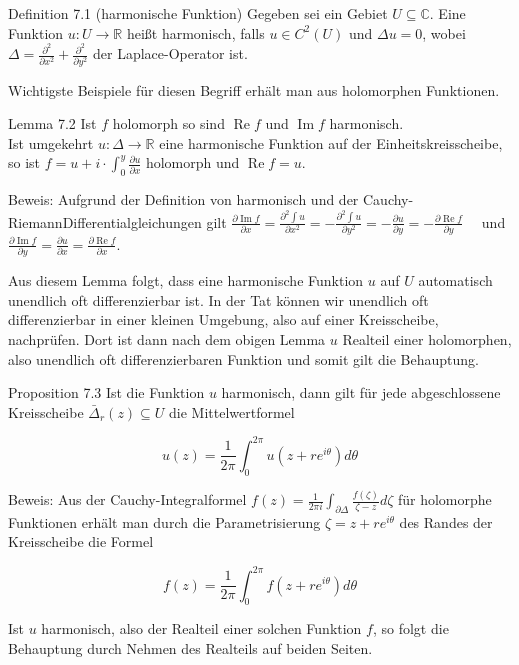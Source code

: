 \documentclass[10pt, letterpaper]{article}
\begin{document}
Definition 7.1 (harmonische Funktion) Gegeben sei ein Gebiet $U \subseteq \mathbb{C}$. Eine Funktion $u: U \rightarrow \mathbb{R}$ heißt harmonisch, falls $u \in C^{2}(U)$ und $\Delta u=0$, wobei $\Delta=\frac{\partial^{2}}{\partial x^{2}}+\frac{\partial^{2}}{\partial y^{2}}$ der Laplace-Operator ist.

Wichtigste Beispiele für diesen Begriff erhält man aus holomorphen Funktionen.

Lemma 7.2 Ist $f$ holomorph so sind $\operatorname{Re} f$ und $\operatorname{Im} f$ harmonisch.\\
Ist umgekehrt $u: \Delta \rightarrow \mathbb{R}$ eine harmonische Funktion auf der Einheitskreisscheibe, so ist $f=u+i \cdot \int_{0}^{y} \frac{\partial u}{\partial x}$ holomorph und $\operatorname{Re} f=u$.

Beweis: Aufgrund der Definition von harmonisch und der Cauchy-RiemannDifferentialgleichungen gilt $\frac{\partial \operatorname{Im} f}{\partial x}=\frac{\partial^{2} \int u}{\partial x^{2}}=-\frac{\partial^{2} \int u}{\partial y^{2}}=-\frac{\partial u}{\partial y}=-\frac{\partial \operatorname{Re} f}{\partial y} \quad$ und $\frac{\partial \operatorname{Im} f}{\partial y}=\frac{\partial u}{\partial x}=\frac{\partial \operatorname{Re} f}{\partial x}$.

Aus diesem Lemma folgt, dass eine harmonische Funktion $u$ auf $U$ automatisch unendlich oft differenzierbar ist. In der Tat können wir unendlich oft differenzierbar in einer kleinen Umgebung, also auf einer Kreisscheibe, nachprüfen. Dort ist dann nach dem obigen Lemma $u$ Realteil einer holomorphen, also unendlich oft differenzierbaren Funktion und somit gilt die Behauptung.

Proposition 7.3 Ist die Funktion $u$ harmonisch, dann gilt für jede abgeschlossene Kreisscheibe $\bar{\Delta}_{r}(z) \subseteq U$ die Mittelwertformel

$$
u(z)=\frac{1}{2 \pi} \int_{0}^{2 \pi} u\left(z+r e^{i \theta}\right) d \theta
$$

Beweis: Aus der Cauchy-Integralformel $f(z)=\frac{1}{2 \pi i} \int_{\partial \Delta} \frac{f(\zeta)}{\zeta-z} d \zeta$ für holomorphe Funktionen erhält man durch die Parametrisierung $\zeta=z+r e^{i \theta}$ des Randes der Kreisscheibe die Formel

$$
f(z)=\frac{1}{2 \pi} \int_{0}^{2 \pi} f\left(z+r e^{i \theta}\right) d \theta
$$

Ist $u$ harmonisch, also der Realteil einer solchen Funktion $f$, so folgt die Behauptung durch Nehmen des Realteils auf beiden Seiten.
\end{document}
